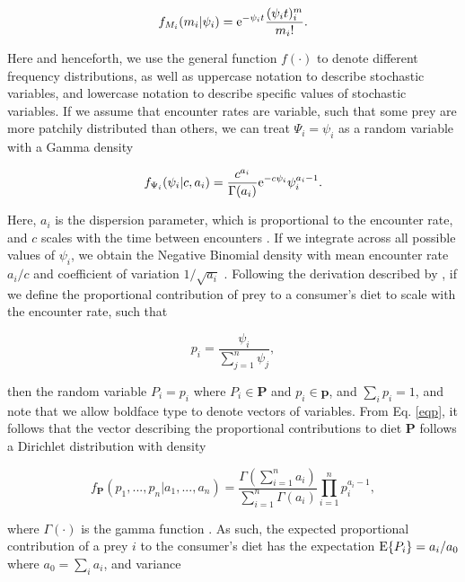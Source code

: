 \documentclass{article}
\begin{document}
\begin{equation}
f_{M_i} (m_i|\psi_i) = {\rm e}^{-\psi_i t}\frac{(\psi_i t)^m_i}{m_i!}.
\end{equation}

\noindent Here and henceforth, we use the general function $f(\cdot)$ to denote different frequency distributions, as well as uppercase notation to describe stochastic variables, and lowercase notation to describe specific values of stochastic variables.
If we assume that encounter rates are variable, such that some prey are more patchily distributed than others, we can treat $\Psi_i = \psi_i$ as a random variable with a Gamma density

\begin{equation}
f_{\Psi_i} (\psi_i | c, a_i) = \frac{c^{a_i}}{\Gamma (a_i)}{\rm e}^{-c \psi_i}\psi_i^{a_i - 1}.
\end{equation}

\noindent Here, $a_i$ is the dispersion parameter, which is proportional to the encounter rate, and $c$ scales with the time between encounters \citep{Mangel:2006wa,Ainsworth:2010uo,Yeakel:2013hi}.
If we integrate across all possible values of $\psi_i$, we obtain the Negative Binomial density with mean encounter rate $a_i/c$ and coefficient of variation $1/\sqrt{a_i}$ \citep{Hilborn:1997ds}.
Following the derivation described by \citet{Ainsworth:2010uo}, if we define the proportional contribution of prey to a consumer's diet to scale with the encounter rate, such that

\begin{equation}
\label{eqp}
  p_i = \frac{\psi_i}{\sum_{j=1}^n \psi_j},
\end{equation}

\noindent then the random variable $P_i = p_i$ where $P_i \in {\bm P}$ and $p_i \in {\bm p}$, and $\sum_i p_i = 1$, and note that we allow boldface type to denote vectors of variables.
From Eq. \ref{eqp}, it follows that the vector describing the proportional contributions to diet $\bm P$ follows a Dirichlet distribution \citep{Johnson:1960gu} with density

\begin{equation}
  f_{\bm P}(p_1,...,p_n|a_1,...,a_n) = \frac{\Gamma(\sum_{i=1}^n a_i)}{\sum_{i=1}^n\Gamma(a_i)}\prod_{i=1}^n p_i^{a_i - 1},
\end{equation}

\noindent where $\Gamma(\cdot)$ is the gamma function \citep[cf.][]{Mangel:2006wa}.
As such, the expected proportional contribution of a prey $i$ to the consumer's diet has the expectation ${\rm E}\{P_i\}=a_i/a_0$ where $a_0 = \sum_i a_i$, and variance
\end{document}
